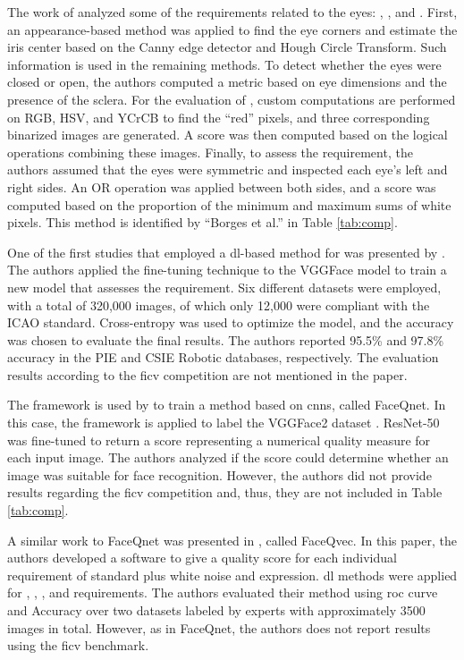 The work of \citet{borges2016analysis} analyzed some of the requirements related to the eyes: \eyesclosed, \redeyes, and \lookingaway. First, an appearance-based method was applied to find the eye corners and estimate the iris center based on the Canny edge detector and Hough Circle Transform. Such information is used in the remaining methods. To detect whether the eyes were closed or open, the authors computed a metric based on eye dimensions and the presence of the sclera. For the evaluation of \redeyes, custom computations are performed on RGB, HSV, and YCrCB to find the ``red'' pixels, and three corresponding binarized images are generated. A score was then computed based on the logical operations combining these images. Finally, to assess the \lookingaway requirement, the authors assumed that the eyes were symmetric and inspected each eye's left and right sides. An OR operation was applied between both sides, and a score was computed based on the proportion of the minimum and maximum sums of white pixels. This method is identified by ``Borges et al.'' in Table \ref{tab:comp}.
 
One of the first studies that employed a \acl{dl}-based method for \icao was presented by \cite{ahmadvand2018estimating}. The authors applied the fine-tuning technique to the VGGFace model \citep{simonyan2014very} to train a new model that assesses the \rollpitchyaw requirement. Six different datasets were employed, with a total of 320,000 images, of which only 12,000 were compliant with the ICAO standard. Cross-entropy was used to optimize the model, and the accuracy was chosen to evaluate the final results. The authors reported 95.5\% and 97.8\% accuracy in the PIE \citep{sim2002cmu} and CSIE Robotic \citep{csie2006database} databases, respectively. The evaluation results according to the \acs{ficv} competition are not mentioned in the paper.
 
The \biolabicao framework is used by \cite{hernandez2019faceqnet} to train a method based on \aclp{cnn}, called FaceQnet. In this case, the framework is applied to label the VGGFace2 dataset \citep{cao2018vggface2}. ResNet-50 \citep{he2016deep} was fine-tuned to return a score representing a numerical quality measure for each input image. The authors analyzed if the score could determine whether an image was suitable for face recognition. However, the authors did not provide results regarding the \acs{ficv} competition and, thus, they are not included in Table \ref{tab:comp}.

A similar work to FaceQnet was presented in \citep{hernandez2022faceqvec}, called FaceQvec. In this paper, the authors developed a software to give a quality score for each individual requirement of \icao standard plus white noise and expression. \acl{dl} methods were applied for \mouthopen, \eyesclosed, \hairacrosseyes, and \rollpitchyaw requirements. The authors evaluated their method using \acf{roc} curve and Accuracy over two \adhoc datasets labeled by experts with approximately 3500 images in total. However, as in FaceQnet, the authors does not report results using the \acs{ficv} benchmark.
 
